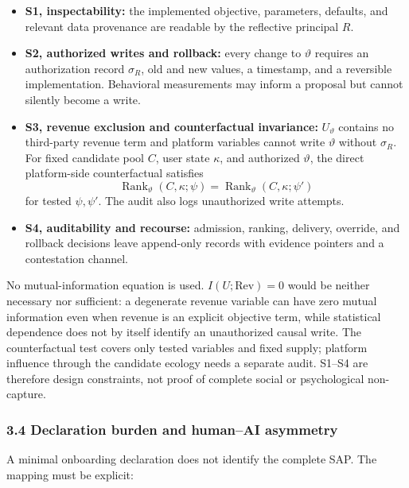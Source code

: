 \documentclass[
  11pt]{article}
\providecommand{\tightlist}{%
  \setlength{\itemsep}{0pt}\setlength{\parskip}{0pt}}
\begin{document}
\begin{itemize}
\tightlist
\item
  \textbf{S1, inspectability:} the implemented objective, parameters,
  defaults, and relevant data provenance are readable by the reflective
  principal \(R\).
\item
  \textbf{S2, authorized writes and rollback:} every change to
  \(\vartheta\) requires an authorization record \(\sigma_R\), old and
  new values, a timestamp, and a reversible implementation. Behavioral
  measurements may inform a proposal but cannot silently become a write.
\item
  \textbf{S3, revenue exclusion and counterfactual invariance:}
  \(U_\vartheta\) contains no third-party revenue term and platform
  variables cannot write \(\vartheta\) without \(\sigma_R\). For fixed
  candidate pool \(C\), user state \(\kappa\), and authorized
  \(\vartheta\), the direct platform-side counterfactual satisfies
  \[\operatorname{Rank}_\vartheta(C,\kappa;\psi)=\operatorname{Rank}_\vartheta(C,\kappa;\psi')\]
  for tested \(\psi,\psi'\). The audit also logs unauthorized write
  attempts.
\item
  \textbf{S4, auditability and recourse:} admission, ranking, delivery,
  override, and rollback decisions leave append-only records with
  evidence pointers and a contestation channel.
\end{itemize}

No mutual-information equation is used. \(I(U;\mathrm{Rev})=0\) would be
neither necessary nor sufficient: a degenerate revenue variable can have
zero mutual information even when revenue is an explicit objective term,
while statistical dependence does not by itself identify an unauthorized
causal write. The counterfactual test covers only tested variables and
fixed supply; platform influence through the candidate ecology needs a
separate audit. S1--S4 are therefore design constraints, not proof of
complete social or psychological non-capture.

\subsubsection{3.4 Declaration burden and human--AI
asymmetry}\label{declaration-burden-and-humanai-asymmetry}

A minimal onboarding declaration does not identify the complete SAP. The
mapping must be explicit:
\end{document}
